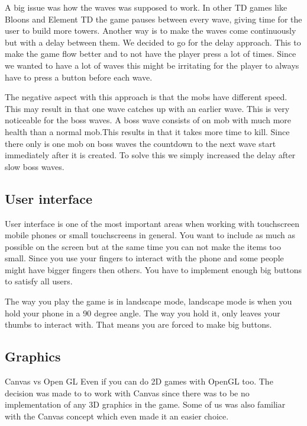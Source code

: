 A big issue was how the waves was supposed to work. In other TD games like Bloons and Element TD the game pauses between every wave, giving time for the user to build more towers.  Another way is to make the waves come continuously but with a delay between them. We decided to go for the delay approach. This to make the game flow better and to not have the player press a lot of times. Since we wanted to have a lot of waves this might be irritating for the player to always have to press a button before each wave.

The negative aspect with this approach is that the mobs have different speed. This may result in that one wave catches up with an earlier wave. This is very noticeable for the boss waves. A boss wave consists of on mob with much more health than a normal mob.This results in that it takes more time to kill. Since there only is one mob on boss waves the countdown to the next wave start immediately after it is created. To solve this we simply increased the delay after slow boss waves.
\subsection{User interface}

User interface is one of the most important areas when working with touchscreen mobile phones or small touchscreens in general. You want to include as much as possible on the screen but at the same time you can not make the items too small. Since you use your fingers to interact with the phone and some people might have bigger fingers then others. You have to implement enough big buttons to satisfy all users. 

The way you play the game is in landscape mode, landscape mode is when you hold your phone in a 90 degree angle. The way you hold it, only leaves your thumbs to interact with. That means you are forced to make big buttons.
\subsection{Graphics}

Canvas vs Open GL
Even if you can do 2D games with OpenGL too. The decision was made to to work with Canvas since there was to be no implementation of any 3D graphics in the game. Some of us was also familiar with the Canvas concept which even made it an easier choice. 

